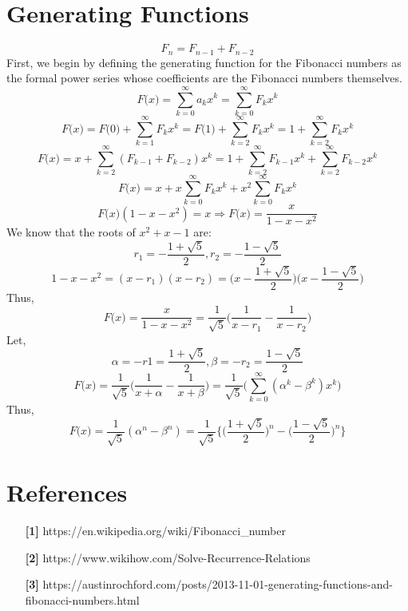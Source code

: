 \documentclass{article}
\begin{document}
\section{Generating Functions}
    \[F_n = F_{n-1} + F_{n-2}\]
    First, we  begin by defining the generating function for the Fibonacci numbers as the formal power series whose coefficients are the Fibonacci numbers themselves.
    \[F\textit{(x)} = \sum_{k=0}^\infty a_kx^k = \sum_{k=0}^\infty F_kx^k\]
    \[F\textit{(x)} = F\textit{(0)} + \sum_{k=1}^\infty F_kx^k = F\textit{(1)} + \sum_{k=2}^\infty F_kx^k = 1  + \sum_{k=2}^\infty F_kx^k \]
    \[F\textit{(x)} = x + \sum_{k=2}^\infty (F_{k-1} + F_{k-2})x^k = 1 + \sum_{k=2}^\infty F_{k-1}x^k + \sum_{k=2}^\infty F_{k-2}x^k\]
    \[F\textit{(x)} = x + x\sum_{k=0}^\infty F_kx^k + x^2\sum_{k=0}^\infty F_kx^k\]
    \[F\textit{(x)}(1 - x - x^2) = x \Longrightarrow F\textit{(x)} = \frac{x}{1 - x - x^2}\]
    We know that the roots of \(x^2 + x - 1\) are:
    \[r_1 = -\frac{1+\sqrt{5}}{2},r_2 = -\frac{1-\sqrt{5}}{2} \]
    \[ 1 - x - x^2 = (x-r_1)(x-r_2) = \bigg(x-\frac{1+\sqrt{5}}{2}\bigg)\bigg(x-\frac{1-\sqrt{5}}{2}\bigg)\]
    Thus,
    \[F\textit{(x)} = \frac{x}{1 - x - x^2} = \frac{1}{\sqrt{5}}\bigg(\frac{1}{x-r_1} -\frac{1}{x-r_2}\bigg)\]
    Let,
    \[\alpha = -r1 = \frac{1+\sqrt{5}}{2}, \beta = -r_2 = \frac{1-\sqrt{5}}{2} \]
    \[F\textit{(x)} = \frac{1}{\sqrt{5}}\bigg(\frac{1}{x+\alpha} -\frac{1}{x+\beta}\bigg) = \frac{1}{\sqrt{5}}\bigg(\sum_{k=0}^\infty (\alpha^k-\beta^k)x^k\bigg)\]
    Thus,
    \begin{equation}
        F\textit{(x)} = \frac{1}{\sqrt{5}}(\alpha^n-\beta^n) = \frac{1}{\sqrt{5}}\bigg\{\bigg(\frac{1+\sqrt{5}}{2}\bigg)^n-\bigg(\frac{1-\sqrt{5}}{2}\bigg)^n\bigg\}
    \end{equation}
    
\section{References}
    \begin{itemize}
        \item[\textbf{[1]}] https://en.wikipedia.org/wiki/Fibonacci\_number
        \item[\textbf{[2]}] https://www.wikihow.com/Solve-Recurrence-Relations
        \item[\textbf{[3]}] https://austinrochford.com/posts/2013-11-01-generating-functions-and-fibonacci-numbers.html
        \end{itemize}
\end{document}
